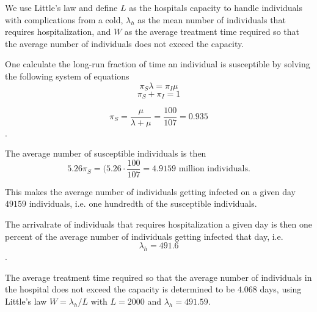 We use Little's law and define $L$ as the hospitals capacity to handle individuals with complications from a cold, $\lambda_h$ as the mean number of individuals that requires hospitalization, and $W$ as the average treatment time required so that the average number of individuals does not exceed the capacity. 

One calculate the long-run fraction of time an individual is susceptible by solving the following system of equations
$$ \pi_S \lambda = \pi_I \mu$$ 
$$ \pi_S + \pi_I = 1 $$

$$ \pi_S = \frac{\mu}{\lambda + \mu} = \frac{100}{107} = 0.935$$.

The average number of susceptible individuals is then 
$$ 5.26  \pi_S = (5.26 \cdot \frac{100}{107} = 4.9159 \text{ million individuals.}$$

This makes the average number of individuals getting infected on a given day $ 49159$ individuals, i.e. one hundredth of the susceptible individuals.

The arrivalrate of individuals that requires hospitalization a given day is then one percent of the average number of individuals getting infected that day, i.e. $$\lambda_h = 491.6$$. 

The average treatment time required so that the average number of individuals in the hospital does not exceed the capacity is determined to be $4.068$ days, using Little's law $W = \lambda_h/L$ with $L = 2000$ and $\lambda_h = 491.59$. 



